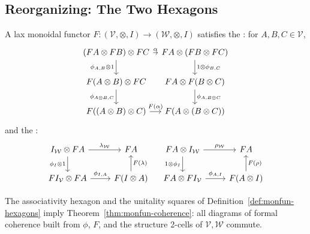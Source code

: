 \subsection{Reorganizing: The Two Hexagons}

\begin{definition}
\label{def:monfun-hexagons}
A lax monoidal functor $F : (\mathcal{V}, \otimes, I) \to (\mathcal{W},
\otimes, I)$ satisfies the : for $A, B, C \in
\mathcal{V}$,
\begin{equation*}
\begin{tikzcd}[column sep=tiny]
  (FA \otimes FB) \otimes FC \arrow[r, "{\alpha}"] \arrow[d, "{\phi_{A,B} \otimes 1}" '] &
  FA \otimes (FB \otimes FC) \arrow[d, "{1 \otimes \phi_{B,C}}"] \\
  F(A \otimes B) \otimes FC \arrow[d, "{\phi_{A \otimes B, C}}" '] &
  FA \otimes F(B \otimes C) \arrow[d, "{\phi_{A, B \otimes C}}"] \\
  F((A \otimes B) \otimes C) \arrow[r, "{F(\alpha)}"] & F(A \otimes (B \otimes C))
\end{tikzcd}
\end{equation*}
and the :
\begin{equation*}
\begin{tikzcd}
  I_\mathcal{W} \otimes FA \arrow[r, "{\lambda_\mathcal{W}}"] \arrow[d, "{\phi_I \otimes 1}" '] &
  FA \\
  FI_\mathcal{V} \otimes FA \arrow[r, "{\phi_{I, A}}"] & F(I \otimes A) \arrow[u, "{F(\lambda)}" ']
\end{tikzcd}
\quad
\begin{tikzcd}
  FA \otimes I_\mathcal{W} \arrow[r, "{\rho_\mathcal{W}}"] \arrow[d, "{1 \otimes \phi_I}" '] &
  FA \\
  FA \otimes FI_\mathcal{V} \arrow[r, "{\phi_{A, I}}"] & F(A \otimes I) \arrow[u, "{F(\rho)}" ']
\end{tikzcd}
\end{equation*}
\end{definition}

\begin{proposition}
\label{prop:hexagons-suffice}
The associativity hexagon and the unitality squares of
Definition~\ref{def:monfun-hexagons} imply Theorem~\ref{thm:monfun-coherence}:
all diagrams of formal coherence built from $\phi$, $F$, and the structure
2-cells of $\mathcal{V}, \mathcal{W}$ commute.
\end{proposition}

